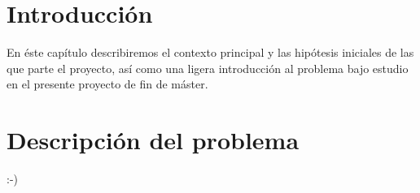 \section{Introducción}

En éste capítulo describiremos el contexto principal y las hipótesis iniciales de las que parte el proyecto, así como una ligera introducción al problema bajo estudio en el presente proyecto de fin de máster.

\section{Descripción del problema}
:-)